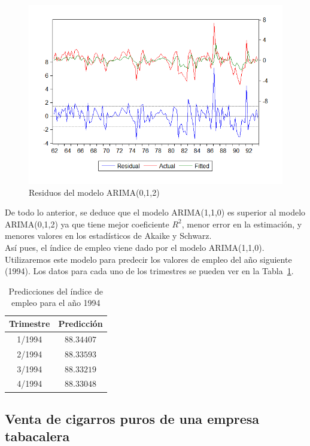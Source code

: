 \documentclass[12pt,a4paper,twoside,openright,titlepage,final]{article}
\begin{document}
\begin{figure}[tbph!]
	\centering
	\includegraphics[width=0.7\linewidth]{imagenes/empleo/modelo2-residuos.png}
	\caption{Residuos del modelo ARIMA(0,1,2)}
	\label{fig:modelo2-residuos}
\end{figure}

De todo lo anterior, se deduce que el modelo ARIMA(1,1,0) es superior al modelo ARIMA(0,1,2) ya que tiene mejor coeficiente $R^2$, menor error en la estimación, y menores valores en los estadísticos de Akaike y Schwarz.\\

Así pues, el índice de empleo viene dado por el modelo ARIMA(1,1,0).\\

Utilizaremos este modelo para predecir los valores de empleo del año siguiente (1994). Los datos para cada uno de los trimestres se pueden ver en la Tabla~\ref{tbl:empleo-predicciones}.\\

 \begin{table}[htbp!]
 	\centering
 	\caption{Predicciones del índice de empleo para el año 1994}
 	\label{tbl:empleo-predicciones}
 	\begin{tabular}{@{}cc@{}}
 		\toprule
 		\textbf{Trimestre} & \textbf{Predicción} \\ \midrule
 		1/1994             & $88.34407$          \\
 		2/1994             & $88.33593$          \\
 		3/1994             & $88.33219$          \\
 		4/1994             & $88.33048$          \\ \bottomrule
 	\end{tabular}
 \end{table}


\clearpage

\subsection{Venta de cigarros puros de una empresa tabacalera}
\end{document}
